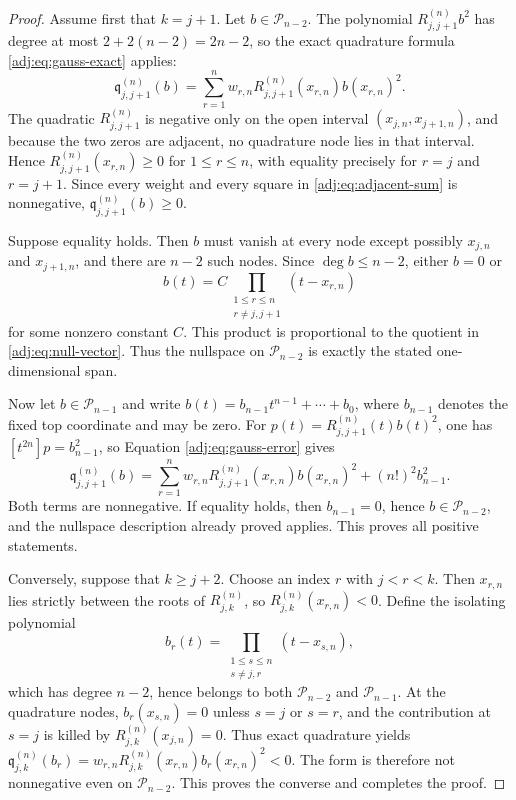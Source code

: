 \documentclass[11pt]{article}
\numberwithin{equation}{section}
\theoremstyle{definition}
\theoremstyle{remark}
\newcommand{\Pcal}{\mathcal P}
\begin{document}
\begin{proof}
Assume first that $k=j+1$. Let $b\in\Pcal_{n-2}$. The polynomial $R_{j,j+1}^{(n)}b^2$ has degree at most $2+2(n-2)=2n-2$, so the exact quadrature formula \eqref{adj:eq:gauss-exact} applies:
\begin{equation}\label{adj:eq:adjacent-sum}
 \mathfrak q_{j,j+1}^{(n)}(b)
 =\sum_{r=1}^n w_{r,n}
 R_{j,j+1}^{(n)}(x_{r,n})b(x_{r,n})^2.
\end{equation}
The quadratic $R_{j,j+1}^{(n)}$ is negative only on the open interval $(x_{j,n},x_{j+1,n})$, and because the two zeros are adjacent, no quadrature node lies in that interval. Hence $R_{j,j+1}^{(n)}(x_{r,n})\geq0$ for $1\leq r\leq n$, with equality precisely for $r=j$ and $r=j+1$. Since every weight and every square in \eqref{adj:eq:adjacent-sum} is nonnegative, $\mathfrak q_{j,j+1}^{(n)}(b)\geq0$.

Suppose equality holds. Then $b$ must vanish at every node except possibly $x_{j,n}$ and $x_{j+1,n}$, and there are $n-2$ such nodes. Since $\deg b\leq n-2$, either $b=0$ or
\[
 b(t)=C\prod_{\substack{1\leq r\leq n\\r\neq j,j+1}}
 (t-x_{r,n})
\]
for some nonzero constant $C$. This product is proportional to the quotient in \eqref{adj:eq:null-vector}. Thus the nullspace on $\Pcal_{n-2}$ is exactly the stated one-dimensional span.

Now let $b\in\Pcal_{n-1}$ and write $b(t)=b_{n-1}t^{n-1}+\cdots+b_0$, where $b_{n-1}$ denotes the fixed top coordinate and may be zero. For $p(t)=R_{j,j+1}^{(n)}(t)b(t)^2$, one has $[t^{2n}]p=b_{n-1}^2$, so Equation \eqref{adj:eq:gauss-error} gives
\[
 \mathfrak q_{j,j+1}^{(n)}(b)
 =\sum_{r=1}^n w_{r,n}
 R_{j,j+1}^{(n)}(x_{r,n})b(x_{r,n})^2
 +(n!)^2b_{n-1}^2.
\]
Both terms are nonnegative. If equality holds, then $b_{n-1}=0$, hence $b\in\Pcal_{n-2}$, and the nullspace description already proved applies. This proves all positive statements.

Conversely, suppose that $k\geq j+2$. Choose an index $r$ with $j<r<k$. Then $x_{r,n}$ lies strictly between the roots of $R_{j,k}^{(n)}$, so $R_{j,k}^{(n)}(x_{r,n})<0$. Define the isolating polynomial
\begin{equation*}
 b_r(t)=
 \prod_{\substack{1\leq s\leq n\\s\neq j,r}}
 (t-x_{s,n}),
\end{equation*}
which has degree $n-2$, hence belongs to both $\Pcal_{n-2}$ and $\Pcal_{n-1}$. At the quadrature nodes, $b_r(x_{s,n})=0$ unless $s=j$ or $s=r$, and the contribution at $s=j$ is killed by $R_{j,k}^{(n)}(x_{j,n})=0$. Thus exact quadrature yields $\mathfrak q_{j,k}^{(n)}(b_r)=w_{r,n}R_{j,k}^{(n)}(x_{r,n})b_r(x_{r,n})^2<0$. The form is therefore not nonnegative even on $\Pcal_{n-2}$. This proves the converse and completes the proof.
\end{proof}
\end{document}
